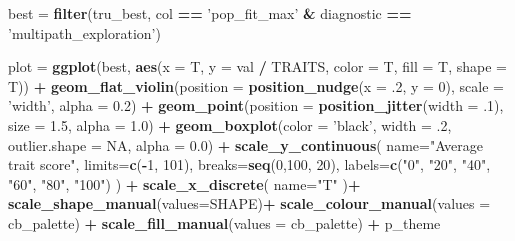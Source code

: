 \documentclass[]{book}
\newenvironment{Shaded}{\begin{snugshade}}{\end{snugshade}}
\newcommand{\DataTypeTok}[1]{\textcolor[rgb]{0.13,0.29,0.53}{#1}}
\newcommand{\DecValTok}[1]{\textcolor[rgb]{0.00,0.00,0.81}{#1}}
\newcommand{\FloatTok}[1]{\textcolor[rgb]{0.00,0.00,0.81}{#1}}
\newcommand{\KeywordTok}[1]{\textcolor[rgb]{0.13,0.29,0.53}{\textbf{#1}}}
\newcommand{\NormalTok}[1]{#1}
\newcommand{\OperatorTok}[1]{\textcolor[rgb]{0.81,0.36,0.00}{\textbf{#1}}}
\newcommand{\OtherTok}[1]{\textcolor[rgb]{0.56,0.35,0.01}{#1}}
\newcommand{\StringTok}[1]{\textcolor[rgb]{0.31,0.60,0.02}{#1}}
\begin{document}
\begin{Shaded}
\begin{Highlighting}[]
\NormalTok{best =}\StringTok{ }\KeywordTok{filter}\NormalTok{(tru_best, col }\OperatorTok{==}\StringTok{ 'pop_fit_max'} \OperatorTok{&}\StringTok{ }\NormalTok{diagnostic }\OperatorTok{==}\StringTok{ 'multipath_exploration'}\NormalTok{)}

\NormalTok{plot =}\StringTok{ }\KeywordTok{ggplot}\NormalTok{(best, }\KeywordTok{aes}\NormalTok{(}\DataTypeTok{x =}\NormalTok{ T, }\DataTypeTok{y =}\NormalTok{ val }\OperatorTok{/}\StringTok{ }\NormalTok{TRAITS, }\DataTypeTok{color =}\NormalTok{ T, }\DataTypeTok{fill =}\NormalTok{ T, }\DataTypeTok{shape =}\NormalTok{ T)) }\OperatorTok{+}
\StringTok{  }\KeywordTok{geom_flat_violin}\NormalTok{(}\DataTypeTok{position =} \KeywordTok{position_nudge}\NormalTok{(}\DataTypeTok{x =} \FloatTok{.2}\NormalTok{, }\DataTypeTok{y =} \DecValTok{0}\NormalTok{), }\DataTypeTok{scale =} \StringTok{'width'}\NormalTok{, }\DataTypeTok{alpha =} \FloatTok{0.2}\NormalTok{) }\OperatorTok{+}
\StringTok{  }\KeywordTok{geom_point}\NormalTok{(}\DataTypeTok{position =} \KeywordTok{position_jitter}\NormalTok{(}\DataTypeTok{width =} \FloatTok{.1}\NormalTok{), }\DataTypeTok{size =} \FloatTok{1.5}\NormalTok{, }\DataTypeTok{alpha =} \FloatTok{1.0}\NormalTok{) }\OperatorTok{+}
\StringTok{  }\KeywordTok{geom_boxplot}\NormalTok{(}\DataTypeTok{color =} \StringTok{'black'}\NormalTok{, }\DataTypeTok{width =} \FloatTok{.2}\NormalTok{, }\DataTypeTok{outlier.shape =} \OtherTok{NA}\NormalTok{, }\DataTypeTok{alpha =} \FloatTok{0.0}\NormalTok{) }\OperatorTok{+}
\StringTok{  }\KeywordTok{scale_y_continuous}\NormalTok{(}
    \DataTypeTok{name=}\StringTok{"Average trait score"}\NormalTok{,}
    \DataTypeTok{limits=}\KeywordTok{c}\NormalTok{(}\OperatorTok{-}\DecValTok{1}\NormalTok{, }\DecValTok{101}\NormalTok{),}
    \DataTypeTok{breaks=}\KeywordTok{seq}\NormalTok{(}\DecValTok{0}\NormalTok{,}\DecValTok{100}\NormalTok{, }\DecValTok{20}\NormalTok{),}
    \DataTypeTok{labels=}\KeywordTok{c}\NormalTok{(}\StringTok{"0"}\NormalTok{, }\StringTok{"20"}\NormalTok{, }\StringTok{"40"}\NormalTok{, }\StringTok{"60"}\NormalTok{, }\StringTok{"80"}\NormalTok{, }\StringTok{"100"}\NormalTok{)}
\NormalTok{  ) }\OperatorTok{+}
\StringTok{  }\KeywordTok{scale_x_discrete}\NormalTok{(}
    \DataTypeTok{name=}\StringTok{"T"}
\NormalTok{  )}\OperatorTok{+}
\StringTok{  }\KeywordTok{scale_shape_manual}\NormalTok{(}\DataTypeTok{values=}\NormalTok{SHAPE)}\OperatorTok{+}
\StringTok{  }\KeywordTok{scale_colour_manual}\NormalTok{(}\DataTypeTok{values =}\NormalTok{ cb_palette) }\OperatorTok{+}
\StringTok{  }\KeywordTok{scale_fill_manual}\NormalTok{(}\DataTypeTok{values =}\NormalTok{ cb_palette) }\OperatorTok{+}
\StringTok{  }\NormalTok{p_theme}


\end{Highlighting}
\end{Shaded}
\end{document}
